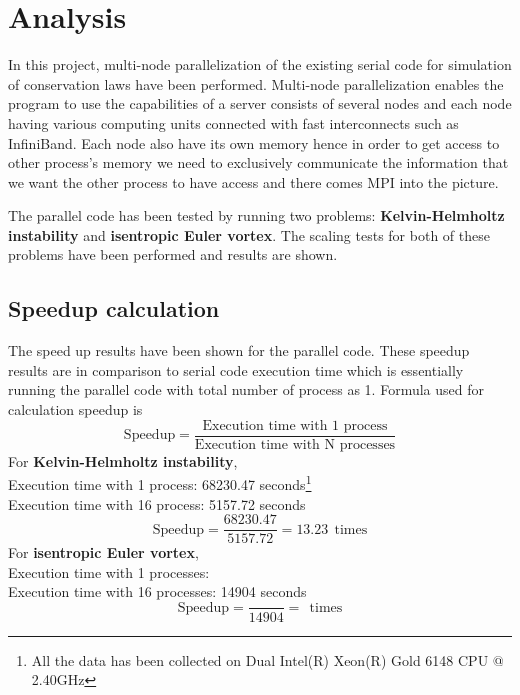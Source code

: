 \section{Analysis}
In this project, multi-node parallelization of the existing serial code for simulation of conservation laws have been performed. Multi-node parallelization enables the program to use the capabilities of a server consists of several nodes and each node having various computing units connected with fast interconnects such as {\ttfamily InfiniBand}. Each node also have its own memory hence in order to get access to other process's memory we need to exclusively communicate the information that we want the other process to have access and there comes {\ttfamily MPI} into the picture.

The parallel code has been tested by running two problems: \textbf{Kelvin-Helmholtz instability} and \textbf{isentropic Euler vortex}. The scaling tests for both of these problems have been performed and results are shown.
\subsection{Speedup calculation}
The speed up results have been shown for the parallel code. These speedup results are in comparison to serial code execution time which is essentially running the parallel code with total number of process as 1. Formula used for calculation speedup is
\begin{equation*}
    \text{Speedup} = \frac{\text{Execution time with 1 process}}{\text{Execution time with N processes}}
\end{equation*}
For \textbf{Kelvin-Helmholtz instability}, \\
Execution time with 1 process: 68230.47 seconds\footnote[3]{All the data has been collected on Dual Intel(R) Xeon(R) Gold 6148 CPU @ 2.40GHz}\\
Execution time with 16 process: 5157.72 seconds
\begin{equation*}
    \text{Speedup} = \frac{68230.47}{5157.72} = 13.23~~\text{times}
\end{equation*}
\linebreak
For \textbf{isentropic Euler vortex},\\
Execution time with 1 processes: \footnotemark[3] \\
Execution time with 16 processes: 14904 seconds
\begin{equation*}
    \text{Speedup} = \frac{}{14904} = ~~\text{times}
\end{equation*}
\vspace{10pt}
